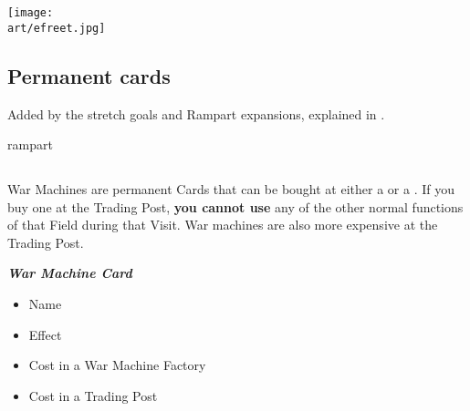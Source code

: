 
\begin{multicols*}{2}

\begin{center}
  \texttt{[image: \\art/efreet.jpg]}
\end{center}
\columnbreak

\subsection*{Permanent cards}
Added by the stretch goals and Rampart expansions, explained in .

\begin{expansion}{rampart}
  \subsection*{}

  War Machines are permanent Cards that can be bought at either a  or a .
  If you buy one at the Trading Post, \textbf{you cannot use} any of the other normal functions of that Field during that Visit.
  War machines are also more expensive at the Trading Post.

  {
    \bigskip
    \centering
    \begin{scriptsize}
    \end{scriptsize}

    \footnotesize
    \textbf{\textit{\textcolor{darkcandyapplered}{War Machine Card}}}
    \begin{itemize}[itemsep=0pt, parsep=5pt, topsep=0pt, partopsep=0pt]
      \item[\textbf{1.}] Name
      \item[\textbf{2.}] Effect
      \item[\textbf{3.}] Cost in a War Machine Factory
      \item[\textbf{4.}] Cost in a Trading Post
    \end{itemize}
  }
\end{expansion}


\end{multicols*}
